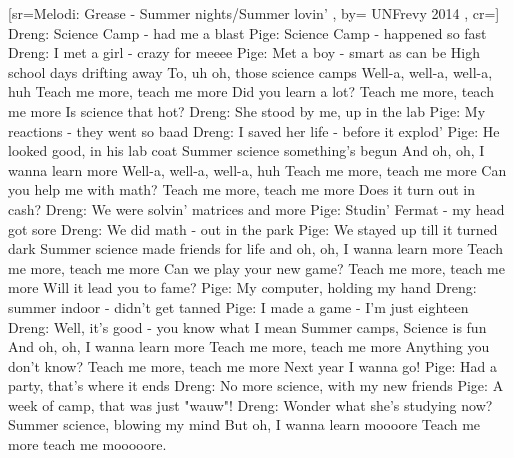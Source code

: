 \documentclass[pdftex,12pt]{article}
\begin{document}
\begin{songs}{}
[sr={Melodi: Grease - Summer nights/Summer lovin'}
,
by={ UNFrevy 2014}
,
cr={}]\hypertarget{Science Summer Lovin}{}
\label{song92}
\beginverse
		Dreng: Science Camp - had me a blast
		Pige: Science Camp - happened so fast
		Dreng: I met a girl - crazy for meeee
		Pige: Met a boy - smart as can be
\endverse
\beginverse
		High school days
		drifting away
		To, uh oh, those science camps
\endverse
\beginverse
		Well-a, well-a, well-a, huh
\endverse
\beginverse
		Teach me more, teach me more
		Did you learn a lot?
		Teach me more, teach me more
		Is science that hot?
\endverse
\beginverse
	Dreng: She stood by me, up in the lab
	Pige: My reactions - they went so baad
	Dreng: I saved her life - before it explod'
	Pige: He looked good, in his lab coat
\endverse
\beginverse
	Summer science
	something's begun
	And oh, oh, I wanna learn more
\endverse
\beginverse
		Well-a, well-a, well-a, huh
\endverse
\beginverse
	Teach me more, teach me more
	Can you help me with math?
	Teach me more, teach me more
	Does it turn out in cash?
\endverse
\beginverse
	Dreng: We were solvin' matrices and more
	Pige: Studin' Fermat - my head got sore
	Dreng: We did math - out in the park
	Pige: We stayed up till it turned dark
\endverse
\beginverse
	Summer science
	made friends for life
	and oh, oh, I wanna learn more
\endverse
\beginverse
	Teach me more, teach me more
	Can we play your new game?
	Teach me more, teach me more
	Will it lead you to fame?
\endverse
\beginverse
	Pige: My computer, holding my hand
	Dreng: summer indoor - didn't get tanned
	Pige: I made a game - I'm just eighteen
	Dreng: Well, it's good - you know what I mean
\endverse
\beginverse
	Summer camps,
	Science is fun
	And oh, oh, I wanna learn more
\endverse
\beginverse
	Teach me more, teach me more
	Anything you don't know?
	Teach me more, teach me more
	Next year I wanna go!
\endverse
\beginverse
	Pige: Had a party, that's where it ends
	Dreng: No more science, with my new friends
	Pige: A week of camp, that was just "wauw"!
	Dreng: Wonder what she's studying now?
\endverse
\beginverse
	Summer science, blowing my mind
	But oh, I wanna learn moooore
\endverse
\beginverse
	Teach me more
	teach me mooooore.
\endverse
\endsong




\end{songs}
\end{document}
